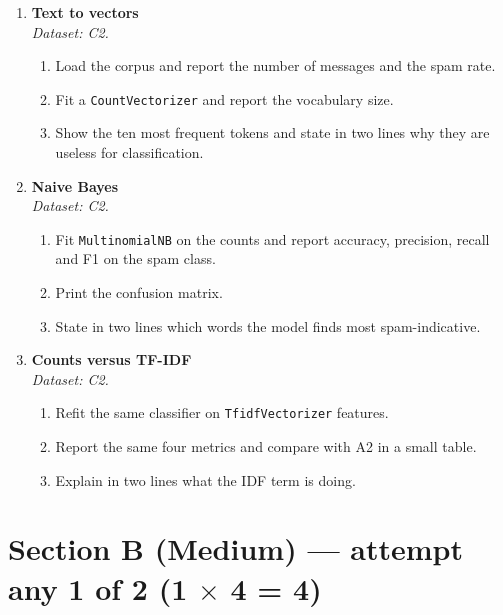\documentclass[11pt,a4paper]{article}
\begin{document}
\begin{enumerate}[label=\textbf{A\arabic*.}, leftmargin=*]

  \item \textbf{Text to vectors} \\
    \emph{Dataset: C2.}
    \begin{enumerate}[label=(\alph*), leftmargin=*]
      \item Load the corpus and report the number of messages and the spam rate.
      \item Fit a \texttt{CountVectorizer} and report the vocabulary size.
      \item Show the ten most frequent tokens and state in two lines why they are useless for classification.
    \end{enumerate}

  \item \textbf{Naive Bayes} \\
    \emph{Dataset: C2.}
    \begin{enumerate}[label=(\alph*), leftmargin=*]
      \item Fit \texttt{MultinomialNB} on the counts and report accuracy, precision, recall and F1 on the spam class.
      \item Print the confusion matrix.
      \item State in two lines which words the model finds most spam-indicative.
    \end{enumerate}

  \item \textbf{Counts versus TF-IDF} \\
    \emph{Dataset: C2.}
    \begin{enumerate}[label=(\alph*), leftmargin=*]
      \item Refit the same classifier on \texttt{TfidfVectorizer} features.
      \item Report the same four metrics and compare with A2 in a small table.
      \item Explain in two lines what the IDF term is doing.
    \end{enumerate}

\end{enumerate}

\section*{Section B (Medium) --- attempt any 1 of 2 \quad (1 $\times$ 4 = 4)}
\end{document}
